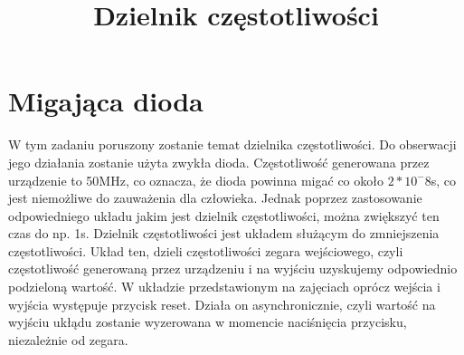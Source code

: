 \documentclass{article}
\title{Dzielnik częstotliwości}
\begin{document}
\maketitle
\section{Migająca dioda}
W tym zadaniu poruszony zostanie temat dzielnika częstotliwości. Do obserwacji jego działania zostanie użyta zwykła dioda. Częstotliwość generowana przez urządzenie to 50MHz, co oznacza, że dioda powinna migać co około $2*10^-8$s, co jest niemożliwe do zauważenia dla człowieka. Jednak poprzez zastosowanie odpowiedniego układu jakim jest dzielnik częstotliwości, można zwiększyć ten czas do np. 1s.
Dzielnik częstotliwości jest układem służącym do zmniejszenia częstotliwości. Układ ten, dzieli częstotliwości zegara wejściowego, czyli częstotliwość generowaną przez urządzeniu i na wyjściu uzyskujemy odpowiednio podzieloną wartość. W układzie przedstawionym na zajęciach oprócz wejścia i wyjścia występuje przycisk reset. Działa on asynchronicznie, czyli wartość na wyjściu ukłądu zostanie wyzerowana w momencie naciśnięcia przycisku, niezależnie od zegara.
\end{document}
